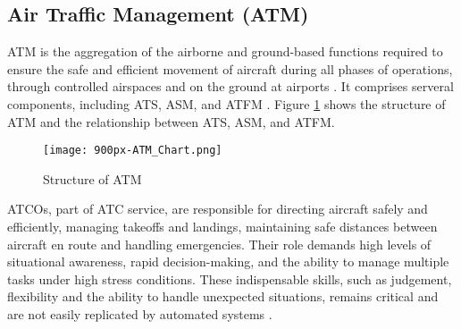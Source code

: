 \subsection{Air Traffic Management (ATM)}

\Gls{ATM} is the aggregation of the airborne and ground-based functions required to ensure the safe and efficient movement of aircraft during all phases of operations, through controlled airspaces and on the ground at airports \cite{skybraryATM}.
It comprises serveral components, including \gls{ATS}, \gls{ASM}, and \gls{ATFM} \cite{skybraryATM}.
Figure \ref{fig:atm-structure} shows the structure of \gls{ATM} and the relationship between \gls{ATS}, \gls{ASM}, and \gls{ATFM}.

\begin{figure}[h]
    \centering
    \texttt{[image: 900px-ATM\_Chart.png]}
    \caption{Structure of \gls{ATM} \cite{skybraryATM}}
    \label{fig:atm-structure}
\end{figure}

\Glspl{ATCO}, part of \gls{ATC} service, are responsible for directing aircraft safely and efficiently, managing takeoffs and landings, maintaining safe distances between aircraft en route and handling emergencies. 
Their role demands high levels of situational awareness, rapid decision-making, and the ability to manage multiple tasks under high stress conditions.
These indispensable skills, such as judgement, flexibility and the ability to handle unexpected situations, remains critical and are not easily replicated by automated systems \cite{eurocontrol2024digitalisation}.
